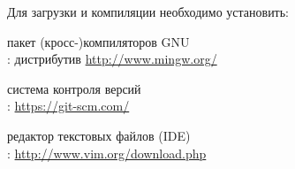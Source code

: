 Для загрузки и компиляции необходимо установить:

\begin{description}
	\item{} пакет (кросс-)компиляторов GNU\\
		\win: дистрибутив  \url{http://www.mingw.org/}
	\item{} система контроля версий\\
		\win: \url{https://git-scm.com/}
	\item{\vim} редактор текстовых файлов (IDE)\\
		\win: \url{http://www.vim.org/download.php}
\end{description}

